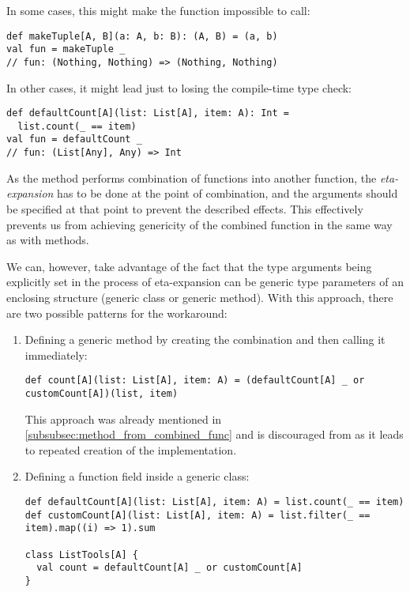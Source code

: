 In some cases, this might make the function impossible to call:
\lstset{style=Scala}
\begin{lstlisting}
def makeTuple[A, B](a: A, b: B): (A, B) = (a, b)
val fun = makeTuple _
// fun: (Nothing, Nothing) => (Nothing, Nothing)
\end{lstlisting}

In other cases, it might lead just to losing the compile-time type check:
\lstset{style=Scala}
\begin{lstlisting}
def defaultCount[A](list: List[A], item: A): Int = 
  list.count(_ == item)
val fun = defaultCount _
// fun: (List[Any], Any) => Int
\end{lstlisting}

As the  method performs combination of functions into another function, the \textit{eta-expansion} has to be done at the point of combination, and the arguments should be specified at that point to prevent the described effects. This effectively prevents us from achieving genericity of the combined function in the same way as with methods. 

We can, however, take advantage of the fact that the type arguments being explicitly set in the process of eta-expansion can be generic type parameters of an enclosing structure (generic class or generic method). With this approach, there are two possible patterns for the workaround:

\begin{enumerate}
		\item Defining a generic method by creating the combination and then calling it immediately:
	\lstset{style=Scala}
	\begin{lstlisting}
def count[A](list: List[A], item: A) = (defaultCount[A] _ or customCount[A])(list, item)
	\end{lstlisting}
	This approach was already mentioned in \ref{subsubsec:method_from_combined_func} and is discouraged from as it leads to repeated creation of the  implementation.
	\item Defining a function field inside a generic class:
	\lstset{style=Scala}
	\begin{lstlisting}
def defaultCount[A](list: List[A], item: A) = list.count(_ == item)
def customCount[A](list: List[A], item: A) = list.filter(_ == item).map((i) => 1).sum

class ListTools[A] {
  val count = defaultCount[A] _ or customCount[A]
}
	\end{lstlisting}
\end{enumerate}

